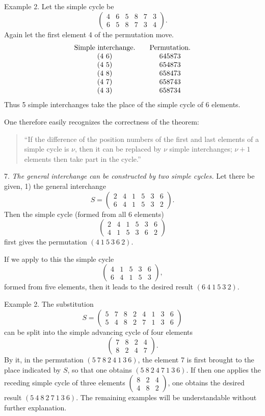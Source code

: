 \documentclass[10pt]{article}
\begin{document}
Example 2. Let the simple cycle be
\[
\begin{pmatrix}4&6&5&8&7&3\\6&5&8&7&3&4\end{pmatrix}.
\]
Again let the first element 4 of the permutation move.
\[
\begin{array}{c@{\qquad}c}
\text{Simple interchange.} & \text{Permutation.}\\
(4\ 6)&645873\\
(4\ 5)&654873\\
(4\ 8)&658473\\
(4\ 7)&658743\\
(4\ 3)&658734
\end{array}
\]
Thus 5 simple interchanges take the place of the simple cycle of 6 elements.

One therefore easily recognizes the correctness of the theorem:
\begin{quote}
``If the difference of the position numbers of the first and last elements of a simple cycle is \(\nu\), then it can be replaced by \(\nu\) simple interchanges; \(\nu+1\) elements then take part in the cycle.''
\end{quote}

7. \emph{The general interchange can be constructed by two simple cycles.} Let there be given, 1) the general interchange
\[
S=\begin{pmatrix}2&4&1&5&3&6\\6&4&1&5&3&2\end{pmatrix}.
\]
Then the simple cycle (formed from all 6 elements)
\[
\begin{pmatrix}2&4&1&5&3&6\\4&1&5&3&6&2\end{pmatrix}
\]
first gives the permutation \((4\ 1\ 5\ 3\ 6\ 2)\).

If we apply to this the simple cycle
\[
\begin{pmatrix}4&1&5&3&6\\6&4&1&5&3\end{pmatrix},
\]
formed from five elements, then it leads to the desired result \((6\ 4\ 1\ 5\ 3\ 2)\).

Example 2. The substitution
\[
S=\begin{pmatrix}5&7&8&2&4&1&3&6\\5&4&8&2&7&1&3&6\end{pmatrix}
\]
can be split into the simple advancing cycle of four elements
\[
\begin{pmatrix}7&8&2&4\\8&2&4&7\end{pmatrix}.
\]
By it, in the permutation \((5\ 7\ 8\ 2\ 4\ 1\ 3\ 6)\), the element 7 is first brought to the place indicated by \(S\), so that one obtains \((5\ 8\ 2\ 4\ 7\ 1\ 3\ 6)\). If then one applies the receding simple cycle of three elements \(\begin{pmatrix}8&2&4\\4&8&2\end{pmatrix}\), one obtains the desired result \((5\ 4\ 8\ 2\ 7\ 1\ 3\ 6)\). The remaining examples will be understandable without further explanation.
\end{document}
